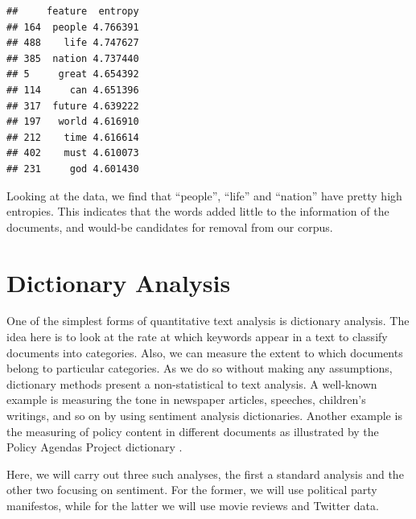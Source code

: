 \documentclass[
]{article}
\newenvironment{Shaded}{\begin{snugshade}}{\end{snugshade}}
\newcommand{\DecValTok}[1]{\textcolor[rgb]{0.00,0.00,0.81}{#1}}
\newcommand{\FunctionTok}[1]{\textcolor[rgb]{0.00,0.00,0.00}{#1}}
\newcommand{\NormalTok}[1]{#1}
\newcommand{\OtherTok}[1]{\textcolor[rgb]{0.56,0.35,0.01}{#1}}
\newcommand{\SpecialCharTok}[1]{\textcolor[rgb]{0.00,0.00,0.00}{#1}}
\newcommand{\StringTok}[1]{\textcolor[rgb]{0.31,0.60,0.02}{#1}}
\begin{document}
\begin{Shaded}
\end{Shaded}

\begin{verbatim}
##     feature  entropy
## 164  people 4.766391
## 488    life 4.747627
## 385  nation 4.737440
## 5     great 4.654392
## 114     can 4.651396
## 317  future 4.639222
## 197   world 4.616910
## 212    time 4.616614
## 402    must 4.610073
## 231     god 4.601430
\end{verbatim}

Looking at the data, we find that ``people'', ``life'' and ``nation'' have pretty high entropies. This indicates that the words added little to the information of the documents, and would-be candidates for removal from our corpus.

\hypertarget{dictionary-analysis}{%
\section{Dictionary Analysis}\label{dictionary-analysis}}

One of the simplest forms of quantitative text analysis is dictionary analysis. The idea here is to look at the rate at which keywords appear in a text to classify documents into categories. Also, we can measure the extent to which documents belong to particular categories. As we do so without making any assumptions, dictionary methods present a non-statistical to text analysis. A well-known example is measuring the tone in newspaper articles, speeches, children's writings, and so on by using sentiment analysis dictionaries. Another example is the measuring of policy content in different documents as illustrated by the Policy Agendas Project dictionary \autocite{Albaugh2013a}.

Here, we will carry out three such analyses, the first a standard analysis and the other two focusing on sentiment. For the former, we will use political party manifestos, while for the latter we will use movie reviews and Twitter data.
\end{document}
